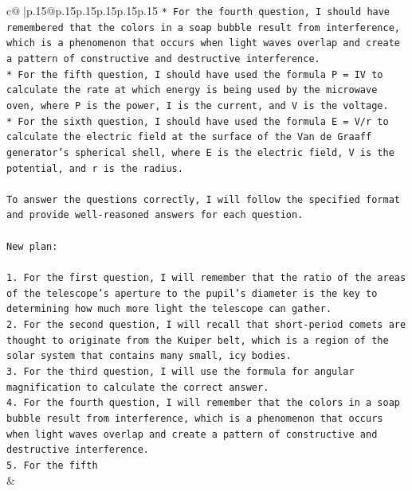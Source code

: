 \documentclass{article}
\begin{document}
{\begin{supertabular}{c@{$\;$}|p{.15\linewidth}@{}p{.15\linewidth}p{.15\linewidth}p{.15\linewidth}p{.15\linewidth}p{.15\linewidth}}
{{{\texttt{* For the fourth question, I should have remembered that the colors in a soap bubble result from interference, which is a phenomenon that occurs when light waves overlap and create a pattern of constructive and destructive interference.} \\
\texttt{* For the fifth question, I should have used the formula P = IV to calculate the rate at which energy is being used by the microwave oven, where P is the power, I is the current, and V is the voltage.} \\
\texttt{* For the sixth question, I should have used the formula E = V/r to calculate the electric field at the surface of the Van de Graaff generator's spherical shell, where E is the electric field, V is the potential, and r is the radius.} \\
\\ 
\texttt{To answer the questions correctly, I will follow the specified format and provide well{-}reasoned answers for each question.} \\
\\ 
\texttt{New plan:} \\
\\ 
\texttt{1. For the first question, I will remember that the ratio of the areas of the telescope's aperture to the pupil's diameter is the key to determining how much more light the telescope can gather.} \\
\texttt{2. For the second question, I will recall that short{-}period comets are thought to originate from the Kuiper belt, which is a region of the solar system that contains many small, icy bodies.} \\
\texttt{3. For the third question, I will use the formula for angular magnification to calculate the correct answer.} \\
\texttt{4. For the fourth question, I will remember that the colors in a soap bubble result from interference, which is a phenomenon that occurs when light waves overlap and create a pattern of constructive and destructive interference.} \\
\texttt{5. For the fifth} \\
            }
        }
    }
    & \\ \\

\end{supertabular}
}
\end{document}
